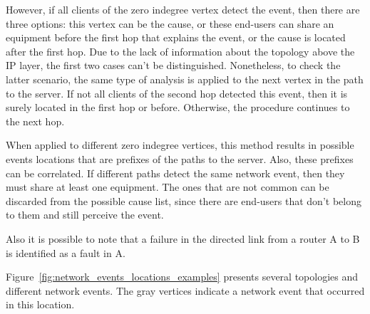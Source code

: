 However, if all clients of the zero indegree vertex detect the event, then
there are three options:
this vertex can be the cause, or these end-users can share an equipment before
the first hop that explains the event,
or the cause is located after the first hop. Due to the
lack of information about the topology above the IP layer, the first two cases
can't be
distinguished. Nonetheless, to check the latter scenario, the same type of
analysis is applied to the next vertex in the path to the server. If not all
clients of the second hop detected this event, then it is surely located
in the first hop or before. Otherwise, the procedure continues to the next hop.

When applied to different zero indegree vertices,
this method results in possible events locations that are prefixes of
the paths to the server.
Also, these prefixes can be correlated.
If different paths detect the same network
event, then they must share at least one equipment. The
ones that are not common can be discarded from the possible cause list, since
there are end-users that don't belong to them and still perceive the event.

Also it is possible to note that a failure in the directed link from a router
A to B is identified as a fault in A.

Figure~\ref{fig:network_events_locations_examples} presents several topologies
and different network events. The gray vertices indicate a network event
that occurred in this location.


